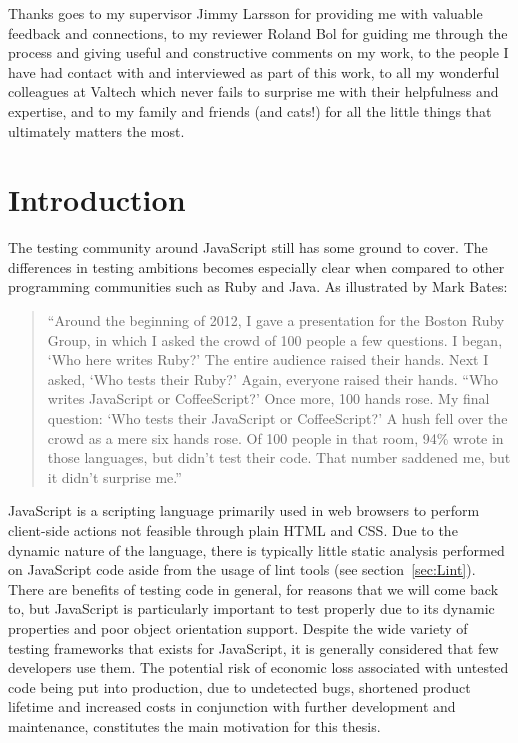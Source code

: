 \documentclass[11pt]{article}
\begin{document}
Thanks goes to my supervisor Jimmy Larsson for providing me with valuable feedback and connections, to my reviewer Roland Bol for guiding me through the process and giving useful and constructive comments on my work, to the people I have had contact with and interviewed as part of this work, to all my wonderful colleagues at Valtech which never fails to surprise me with their helpfulness and expertise, and to my family and friends (and cats!) for all the little things that ultimately matters the most.

\newpage
\clearpage\mbox{}\clearpage
\newpage

\tableofcontents

\newpage
\clearpage\mbox{}\clearpage
\newpage


\section{Introduction}

The testing community around JavaScript still has some ground to cover. The differences in testing ambitions becomes especially clear when compared to other programming communities such as Ruby and Java. As illustrated by Mark Bates\cite{TestingStatistics}:

\begin{quote}
``Around the beginning of 2012, I gave a presentation for the Boston Ruby Group, in which I asked the crowd of 100 people a few questions. I began, `Who here writes Ruby?' The entire audience raised their hands. Next I asked, `Who tests their Ruby?' Again, everyone raised their hands. ``Who writes JavaScript or CoffeeScript?' Once more, 100 hands rose. My final question: `Who tests their JavaScript or CoffeeScript?' A hush fell over the crowd as a mere six hands rose. Of 100 people in that room, 94\% wrote in those languages, but didn't test their code. That number saddened me, but it didn't surprise me.''
\end{quote}

JavaScript is a scripting language primarily used in web browsers to perform client-side actions not feasible through plain HTML and CSS. Due to the dynamic nature of the language, there is typically little static analysis performed on JavaScript code aside from the usage of lint tools (see section~\ref{sec:Lint}). There are benefits of testing code in general, for reasons that we will come back to, but JavaScript is particularly important to test properly due to its dynamic properties and poor object orientation support. Despite the wide variety of testing frameworks that exists for JavaScript, it is generally considered that few developers use them. The potential risk of economic loss associated with untested code being put into production, due to undetected bugs, shortened product lifetime and increased costs in conjunction with further development and maintenance, constitutes the main motivation for this thesis.
\end{document}
